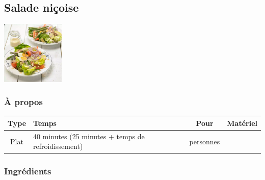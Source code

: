 \subsection{Salade niçoise}



\begin{center}
	\includegraphics[trim={0 0 0 0},clip,height=3cm,width=0.8\linewidth]{./img/salade-nicoise.png}
\end{center}


\subsubsection*{À propos}

\begin{center}
	\begin{tabularx}{0.8\linewidth}{|c|X|c|c|} \hline
		Type & Temps & Pour & Matériel \\ \hline
		Plat & 40 minutes (25 minutes + temps de refroidissement) & \curef{salade-nicoise} personnes & \Gasstove \\ \hline
	\end{tabularx}
\end{center}


\subsubsection*{Ingrédients}

